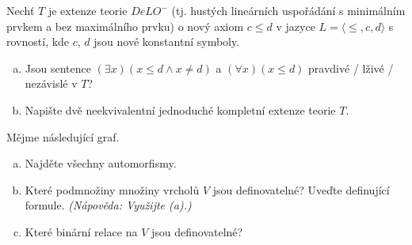 \begin{problem}

    Nechť $T$ je extenze teorie $DeLO^-$ (tj. hustých lineárních uspořádání s minimálním prvkem a bez maximálního prvku) o nový axiom $c \le d$ v jazyce $L=\langle \le,c,d\rangle$ s rovností, kde $c$, $d$ jsou nové konstantní symboly.
    \begin{enumerate}[(a)]
        \item Jsou sentence $(\exists x)(x\le d \wedge x \ne d)$ a $(\forall x)(x \le d)$ pravdivé / lživé / nezávislé v $T$?
        \item Napište dvě neekvivalentní jednoduché kompletní extenze teorie $T$.
    \end{enumerate}
    
\end{problem}


\begin{problem}

    Mějme následující graf.
    \smallskip
    
    \begin{minipage}{.72\textwidth}
        \begin{enumerate}[(a)]
            \item Najděte všechny automorfismy.
            \item Které podmnožiny množiny vrcholů $V$ jsou definovatelné? Uveďte definující formule. {\it (Nápověda: Využijte (a).)}
            \item Které binární relace na $V$ jsou definovatelné?
        \end{enumerate}
    \end{minipage}%
    \begin{minipage}{.28\textwidth}        
        \vspace{-12pt}\hspace{12pt}
    \end{minipage}%

\end{problem}


